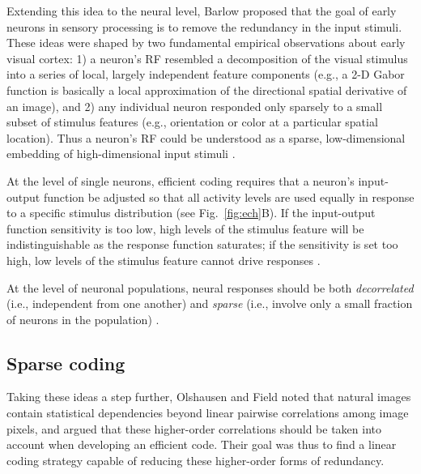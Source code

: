 Extending this idea to the neural level,
Barlow \cite{Barlow1961} proposed that
the goal of early neurons in sensory processing is to remove
the redundancy in the input stimuli.
These ideas were shaped by two
fundamental empirical observations
about early visual cortex:
1) a neuron's \ac{RF} resembled a decomposition of the visual
stimulus into a series of local, largely independent feature components
(e.g., a 2-D Gabor function is basically a local approximation of the
directional spatial derivative of an image),
and 2) any individual neuron responded only sparsely to a small subset of
stimulus features (e.g., orientation or color at a particular spatial location).
Thus a neuron's \ac{RF} could be understood as a
sparse, low-dimensional embedding of high-dimensional input stimuli
\cite{Barbieri2015}.

At the level of single neurons, efficient coding requires
that a neuron's input-output function be adjusted so that all
activity levels are used equally in response to a specific
stimulus distribution \cite{Simoncelli2003} (see Fig.~\ref{fig:ech}B).
If the input-output function sensitivity is too low,
high levels of the stimulus feature will be indistinguishable
as the response function saturates; if the sensitivity is set too high,
low levels of the stimulus feature cannot drive responses 
\cite{LouieGlimcher2012}.

At the level of neuronal populations,
neural responses should be both \emph{decorrelated}
(i.e., independent from one another)
and \emph{sparse}
(i.e., involve only a small fraction of neurons in the population)
\cite{LouieGlimcher2012}.


\subsection*{Sparse coding}

Taking these ideas a step further,
Olshausen and Field \cite{OlshausenField1996b} 
noted that natural images contain statistical
dependencies beyond linear pairwise correlations among image pixels,
and argued that these higher-order correlations should be taken into
account when developing an efficient code.
Their goal was thus to find a linear coding strategy
capable of reducing these higher-order forms of redundancy.

